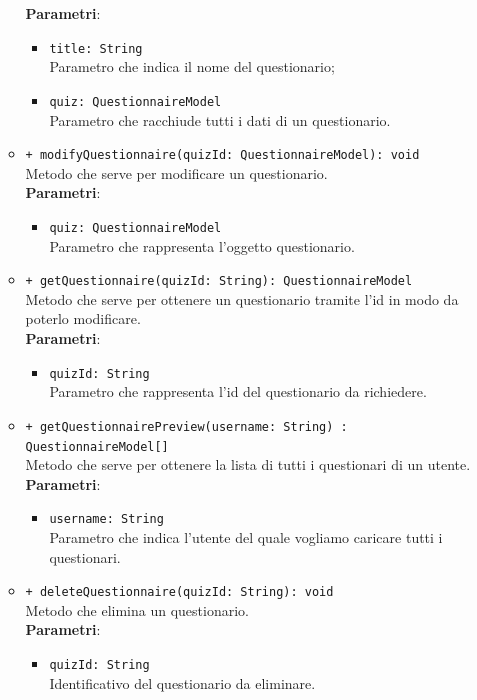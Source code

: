\begin{itemize}
\begin{itemize}
			\textbf{Parametri}:
			\begin{itemize}
				\item \texttt{title: String} \\ Parametro che indica il nome del questionario;
				\item \texttt{quiz: QuestionnaireModel} \\ Parametro che racchiude tutti i dati di un questionario.
			\end{itemize}
			\item \texttt{+ modifyQuestionnaire(quizId: QuestionnaireModel): void} \\ Metodo che serve per modificare un questionario. \\
			\textbf{Parametri}:
			\begin{itemize}
				\item \texttt{quiz: QuestionnaireModel}\\
				Parametro che rappresenta l'oggetto questionario.
			\end{itemize}
			\item \texttt{+ getQuestionnaire(quizId: String): QuestionnaireModel} \\Metodo che serve per ottenere un questionario tramite l'id in modo da poterlo modificare. \\
			\textbf{Parametri}:
			\begin{itemize}
				\item \texttt{quizId: String}\\
				Parametro che rappresenta l'id del questionario da richiedere.
			\end{itemize}
			\item \texttt{+ getQuestionnairePreview(username: String) : QuestionnaireModel[]} \\ Metodo che serve per ottenere la lista di tutti i questionari di un utente. \\
			\textbf{Parametri}:
			\begin{itemize}
				\item \texttt{username: String}\\
				Parametro che indica l'utente del quale vogliamo caricare tutti i questionari.
			\end{itemize}
			\item \texttt{+ deleteQuestionnaire(quizId: String): void} \\ 
			Metodo che elimina un questionario. \\
			\textbf{Parametri}:
			\begin{itemize}
				\item \texttt{quizId: String}\\
				Identificativo del questionario da eliminare.
			\end{itemize}
			

\end{itemize}
\end{itemize}
